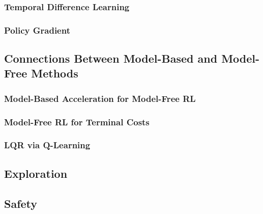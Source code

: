 \subsubsection{Temporal Difference Learning}



\subsubsection{Policy Gradient}


\subsection{Connections Between Model-Based and Model-Free Methods}


\subsubsection{Model-Based Acceleration for Model-Free RL}

\subsubsection{Model-Free RL for Terminal Costs}

\subsubsection{LQR via Q-Learning}


\subsection{Exploration}


\subsection{Safety}


